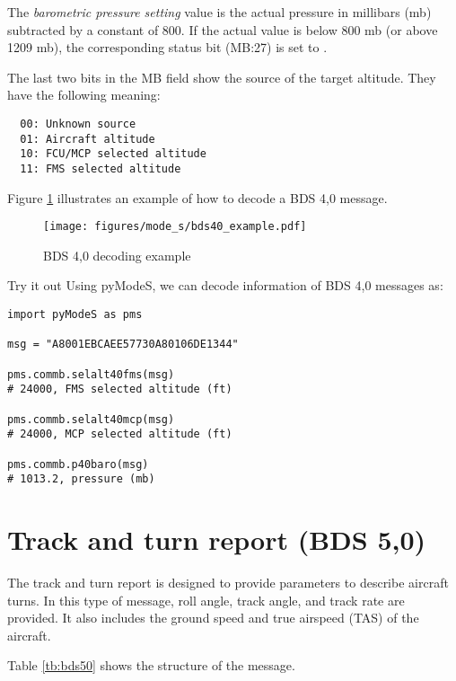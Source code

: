 The \emph{barometric pressure setting} value is the actual pressure in millibars (mb) subtracted by a constant of 800. If the actual value is below 800 mb (or above 1209 mb), the corresponding status bit (MB:27) is set to \0.

The last two bits in the MB field show the source of the target altitude. They have the following meaning:

\begin{verbatim}
  00: Unknown source
  01: Aircraft altitude
  10: FCU/MCP selected altitude
  11: FMS selected altitude
\end{verbatim}


Figure \ref{fig:bds40_example} illustrates an example of how to decode a BDS 4,0 message.

\begin{figure}[ht]
  \centering
  \texttt{[image: figures/mode\_s/bds40\_example.pdf]}
  \caption{BDS 4,0 decoding example}
  \label{fig:bds40_example}
\end{figure}

\begin{notebox}{Try it out}
Using pyModeS, we can decode information of BDS 4,0 messages as: 

\begin{verbatim}
import pyModeS as pms

msg = "A8001EBCAEE57730A80106DE1344"

pms.commb.selalt40fms(msg)
# 24000, FMS selected altitude (ft)

pms.commb.selalt40mcp(msg)
# 24000, MCP selected altitude (ft)

pms.commb.p40baro(msg)
# 1013.2, pressure (mb)
\end{verbatim}

\end{notebox}


\clearpage

\section{Track and turn report (BDS 5,0)}

The track and turn report is designed to provide parameters to describe aircraft turns. In this type of message, roll angle, track angle, and track rate are provided. It also includes the ground speed and true airspeed (TAS) of the aircraft.

Table \ref{tb:bds50} shows the structure of the message.

